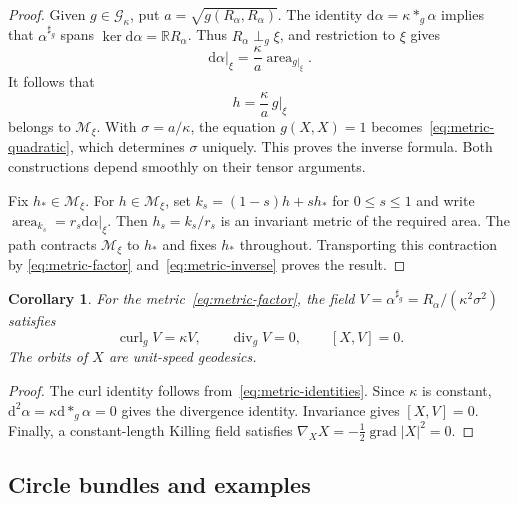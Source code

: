 \documentclass[11pt,a4paper]{article}
\numberwithin{equation}{section}
\newtheorem{corollary}[theorem]{Corollary}
\theoremstyle{definition}
\theoremstyle{remark}
\newcommand{\dd}{\mathrm d}
\begin{document}
\begin{proof}
Given $g\in\mathcal G_\kappa$, put $a=\sqrt{g(R_\alpha,R_\alpha)}$.
The identity $\dd\alpha=\kappa *_g\alpha$ implies that
$\alpha^{\sharp_g}$ spans $\ker\dd\alpha=\mathbb RR_\alpha$.
Thus $R_\alpha\perp_g\xi$, and restriction to $\xi$ gives
\[
 \dd\alpha|_\xi=\frac\kappa a\operatorname{area}_{g|_\xi}.
\]
It follows that
\begin{equation}\label{eq:metric-inverse}
 h=\frac\kappa a\,g|_\xi
\end{equation}
belongs to $\mathcal M_\xi$. With $\sigma=a/\kappa$, the equation
$g(X,X)=1$ becomes~\eqref{eq:metric-quadratic}, which determines
$\sigma$ uniquely. This proves the inverse formula. Both constructions
depend smoothly on their tensor arguments.

Fix $h_*\in\mathcal M_\xi$. For $h\in\mathcal M_\xi$, set
$k_s=(1-s)h+sh_*$ for $0\leq s\leq1$ and write
$\operatorname{area}_{k_s}=r_s\dd\alpha|_\xi$.
Then $h_s=k_s/r_s$ is an invariant metric of the required area.
The path contracts $\mathcal M_\xi$ to $h_*$ and fixes $h_*$
throughout. Transporting this contraction by
\eqref{eq:metric-factor} and~\eqref{eq:metric-inverse} proves the result.
\end{proof}

\begin{corollary}
For the metric~\eqref{eq:metric-factor}, the field
$V=\alpha^{\sharp_g}=R_\alpha/(\kappa^2\sigma^2)$ satisfies
\[
 \operatorname{curl}_gV=\kappa V,\qquad
 \operatorname{div}_gV=0,\qquad [X,V]=0.
\]
The orbits of $X$ are unit-speed geodesics.
\end{corollary}

\begin{proof}
The curl identity follows from~\eqref{eq:metric-identities}.
Since $\kappa$ is constant, $\dd^2\alpha=\kappa\dd *_g\alpha=0$
gives the divergence identity. Invariance gives $[X,V]=0$.
Finally, a constant-length Killing field satisfies
$\nabla_XX=-\frac12\operatorname{grad}|X|^2=0$.
\end{proof}

\subsection{Circle bundles and examples}
\end{document}
